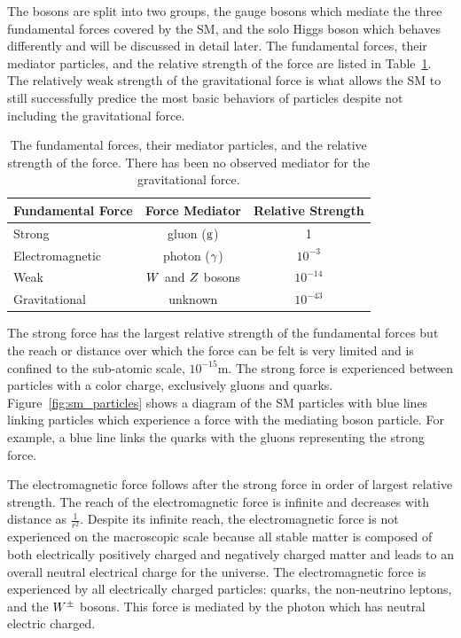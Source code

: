 The bosons are split into two groups, the gauge bosons which mediate the three fundamental
forces covered by the SM, and the solo Higgs boson which behaves differently
and will be discussed in detail later. 
The fundamental forces, their mediator particles, and the relative strength of the force
are listed in Table~\ref{tab:sm_forces}. The relatively weak strength of the gravitational
force is what allows the SM to still successfully predice the most basic behaviors
of particles despite not including the gravitational force.

\begin{table}[htbp]
\centering
\begin{tabular}{lcc}
Fundamental Force        &    Force Mediator             & Relative Strength   \\
\hline
Strong                   &    gluon ($\text{g}$)              &   1                 \\ 
Electromagnetic          &    photon ($\gamma$)            &   $10^{-3}$         \\ 
Weak                     &    $W$ and $Z$ bosons     &   $10^{-14}$        \\ 
Gravitational            &    unknown                    &   $10^{-43}$        \\ 
\hline
\end{tabular}
\caption{
The fundamental forces, their mediator particles, and the relative strength of the force.
There has been no observed mediator for the gravitational force.
}
\label{tab:sm_forces}
\end{table}

The strong force has the largest relative strength of the fundamental forces but
the reach or distance over which the force can be felt is very limited and is 
confined to the sub-atomic scale, $10^{-15}$m. The strong force is experienced
between particles with a color charge, exclusively gluons and quarks.
Figure~\ref{fig:sm_particles} shows a diagram of the SM particles with blue
lines linking particles which experience a force with the mediating boson particle.
For example, a blue line links the quarks with the gluons representing the
strong force.

The electromagnetic force follows after the strong force in order of largest relative
strength. The reach of the electromagnetic force is infinite and decreases with
distance as $\frac{1}{r^{2}}$. Despite its infinite reach, the electromagnetic 
force is not experienced on the macroscopic scale because all stable matter is composed
of both electrically positively charged and negatively charged matter and leads to
an overall neutral electrical charge for the universe. The electromagnetic force is experienced by all
electrically charged particles: quarks, the non-neutrino leptons, and the $W^{\pm}$ bosons.
This force is mediated by the photon which has neutral electric charged.

